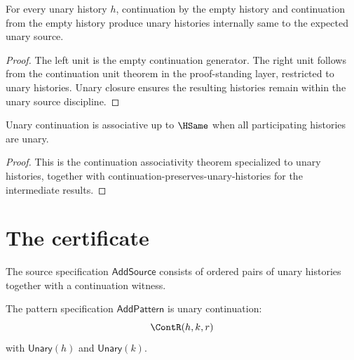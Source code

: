 \begin{lemma}
\label{lem:unary-continuation-unit}
For every unary history \(h\), continuation by the empty history and continuation from the empty history produce unary histories internally same to the expected unary source.
\end{lemma}
\begin{proof}
The left unit is the empty continuation generator. The right unit follows from the continuation unit theorem in the proof-standing layer, restricted to unary histories. Unary closure ensures the resulting histories remain within the unary source discipline.
\end{proof}

\begin{lemma}
\label{lem:unary-continuation-associativity}
Unary continuation is associative up to \(\HSame\) when all participating histories are unary.
\end{lemma}
\begin{proof}
This is the continuation associativity theorem specialized to unary histories, together with continuation-preserves-unary-histories for the intermediate results.
\end{proof}

\section{The certificate}

\begin{definition}
\label{def:additive-source-specification}
The source specification \(\mathsf{AddSource}\) consists of ordered pairs of unary histories together with a continuation witness.
\end{definition}

\begin{definition}
\label{def:additive-pattern-specification}
The pattern specification \(\mathsf{AddPattern}\) is unary continuation:
$$
  \ContR(h,k,r)
$$
with \(\mathsf{Unary}(h)\) and \(\mathsf{Unary}(k)\).
\end{definition}

